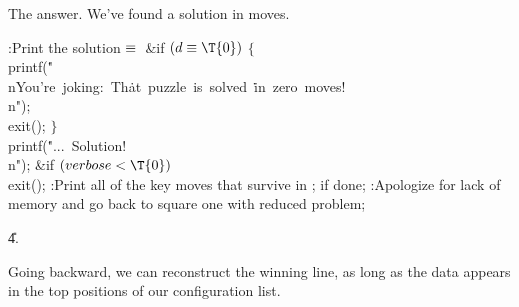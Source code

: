 The answer. We've found a solution in  moves.

\Y\B\4:Print the solution\X${}\equiv{}$\6
\&{if} ${}(\|d\E\T{0}){}$\5
${}\{{}$\1\6
\\{printf}(\.{"\\nYou're\ joking:\ Th}\)\.{at\ puzzle\ is\ solved\ }\)\.{in\
zero\ moves!\\n"});\6
\\{exit}();\6
\4${}\}{}$\2\6
\\{printf}(\.{"...\ Solution!\\n"});\6
\&{if} ${}(\\{verbose}<){}$\1\5
\\{exit}(\T{0});\2\6
:Print all of the key moves that survive in ;  if
done\X;\6
:Apologize for lack of memory and go back to square one with reduced
problem\X;\par
\U4.\fi

Going backward, we can reconstruct the winning line, as long as the data
appears in the top \PB{\\{memsize}} positions of our configuration list.

